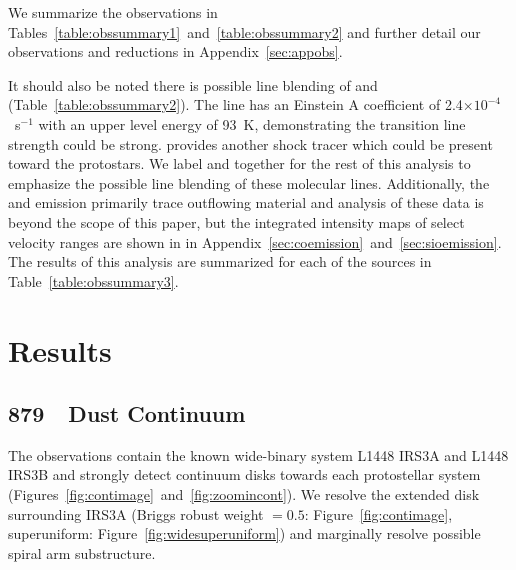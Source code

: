 \documentclass[twocolumn, 12pt, trackchanges]{aastex63}
\begin{document}
We summarize the observations in Tables~\ref{table:obssummary1}~and~\ref{table:obssummary2} and further detail our observations and reductions in Appendix~\ref{sec:appobs}.

It should also be noted there is possible line blending of \lhtcn\space and \lsot\space\citep{1997Icar..130..355L} (Table~\ref{table:obssummary2}). The \sot\space line has an Einstein A coefficient of 2.4$\times10^{-4}$~s$^{-1}$ with an upper level energy of 93~K, demonstrating the transition line strength could be strong. \sot\space provides another shock tracer which could be present toward the protostars. We label \htcn\space and \sot\space together for the rest of this analysis to emphasize the possible line blending of these molecular lines. Additionally, the \co\space and \sio\space emission primarily trace outflowing material and analysis of these data is beyond the scope of this paper, but the integrated intensity maps of select velocity ranges are shown in in Appendix~\ref{sec:coemission}~and~\ref{sec:sioemission}. The results of this analysis are summarized for each of the sources in Table~\ref{table:obssummary3}.


\section{Results}\label{sec:results}
\subsection{879~\micron~Dust Continuum}\label{sec:dcont}
The observations contain the known wide-binary system L1448 IRS3A and L1448 IRS3B and strongly detect continuum disks towards each protostellar system (Figures~\ref{fig:contimage}~and~\ref{fig:zoomincont}). We resolve the extended disk surrounding IRS3A (Briggs robust weight $=0.5$: Figure~\ref{fig:contimage}, superuniform: Figure~\ref{fig:widesuperuniform}) and marginally resolve possible spiral arm substructure. 
\end{document}
